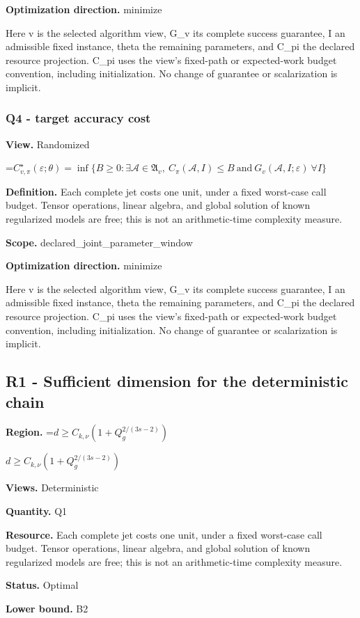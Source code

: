 \documentclass[10pt,a4paper]{article}
\newcommand{\AtlasMath}[1]{\par\begingroup\centering\setbox0=\hbox{$\displaystyle #1$}\ifdim\wd0>1.4\linewidth\typeout{ATLAS WIDE FORMULA: \the\wd0}\fi\ifdim\wd0>\linewidth\resizebox{\linewidth}{!}{\box0}\else\box0\fi\par\endgroup}
\newcommand{\AtlasInlineMath}[1]{\begingroup\setbox0=\hbox{$#1$}\ifdim\wd0>.4\linewidth\endgroup\AtlasMath{#1}\else\endgroup$#1$\fi}
\begin{document}
\textbf{Optimization direction.} minimize

Here v is the selected algorithm view, G\_v its complete success guarantee, I an admissible fixed instance, theta the remaining parameters, and C\_pi the declared resource projection. C\_pi uses the view's fixed-path or expected-work budget convention, including initialization. No change of guarantee or scalarization is implicit.

\subsubsection{Q4 - target accuracy cost}
\textbf{View.} Randomized

\AtlasMath{C^\star_{v,\pi}(\varepsilon;\theta)=\inf\{B\ge0:\exists\mathcal A\in\mathfrak A_v,\ C_\pi(\mathcal A,I)\le B\ \text{and}\ G_v(\mathcal A,I;\varepsilon)\ \forall I\}}
\textbf{Definition.} Each complete jet costs one unit, under a fixed worst-case call budget. Tensor operations, linear algebra, and global solution of known regularized models are free; this is not an arithmetic-time complexity measure.

\textbf{Scope.} declared\_joint\_parameter\_window

\textbf{Optimization direction.} minimize

Here v is the selected algorithm view, G\_v its complete success guarantee, I an admissible fixed instance, theta the remaining parameters, and C\_pi the declared resource projection. C\_pi uses the view's fixed-path or expected-work budget convention, including initialization. No change of guarantee or scalarization is implicit.

\subsection{R1 - Sufficient dimension for the deterministic chain}
\textbf{Region.} \AtlasInlineMath{d\ge C_{k,\nu}(1+Q_g^{2/(3s-2)})}

\textbf{Views.} Deterministic

\textbf{Quantity.} Q1

\textbf{Resource.} Each complete jet costs one unit, under a fixed worst-case call budget. Tensor operations, linear algebra, and global solution of known regularized models are free; this is not an arithmetic-time complexity measure.

\textbf{Status.} Optimal

\textbf{Lower bound.} B2
\end{document}
